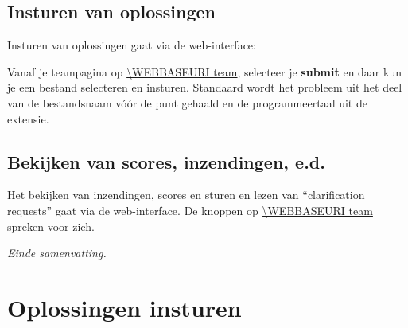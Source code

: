 \subsection*{Insturen van oplossingen}

Insturen van oplossingen gaat via%
de web-interface:
\begin{description}[\breaklabel\setlabelstyle{\bfseries}]
\item[Web-Interface]
Vanaf je teampagina op \url{\WEBBASEURI team}, selecteer je
\textbf{submit} en daar kun je een bestand selecteren en insturen.
Standaard wordt het probleem uit het deel van de bestandsnaam v\'o\'or de
punt gehaald en de programmeertaal uit de extensie.

\end{description}

\subsection*{Bekijken van scores, inzendingen, e.d.}

Het bekijken van inzendingen, scores en sturen en lezen van
``clarification requests'' gaat via de web-interface. De knoppen op
\url{\WEBBASEURI team} spreken voor zich.

\emph{Einde samenvatting.}

\newpage

\section{Oplossingen insturen}\label{submit}

